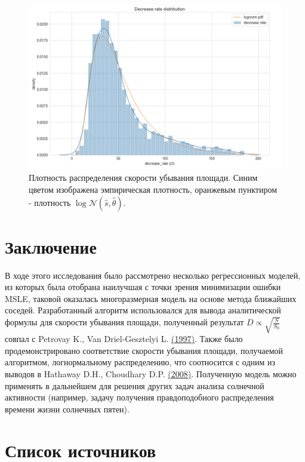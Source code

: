 \documentclass[a4paper, 12pt]{article}
\newcommand{\bibref}[3]{#2 \hyperlink{#1}{\color{blue}(#3)}}
\begin{document}
\begin{figure}[H]
    \centering
    \includegraphics[width=17cm]{density.png}
    \caption{Плотность распределения скорости убывания площади. Синим цветом изображена эмпирическая плотность, оранжевым пунктиром - плотность $\log \mathcal{N}(\widehat{s}, \widehat{\theta})$.}
    \label{fig:my_label}
\end{figure}

\newpage
\section{Заключение}

В ходе этого исследования было рассмотрено несколько регрессионных моделей, из которых была отобрана наилучшая с точки зрения минимизации ошибки MSLE, таковой оказалась многоразмерная модель на основе метода ближайших соседей. Разработанный алгоритм использовался для вывода аналитической формулы для скорости убывания площади, полученный результат $D \propto \sqrt{\frac{S}{S_0}}$ совпал с \bibref{petrovay}{Petrovay K., Van Driel-Gesztelyi L.}{1997}. Также было продемонстрировано соответствие скорости убывания площади, получаемой алгоритмом, логнормальному распределению, что соотносится с одним из выводов в \bibref{hathaway}{Hathaway D.H., Choudhary D.P.}{2008}. Полученную модель можно применять в дальнейшем для решения других задач анализа солнечной активности (например, задачу получения правдоподобного распределения времени жизни солнечных пятен).

\newpage
\section{Список источников}
\end{document}
